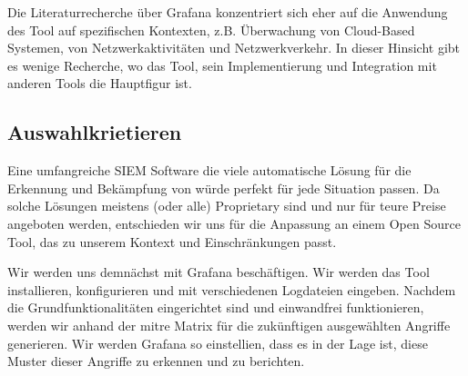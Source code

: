 Die Literaturrecherche über Grafana konzentriert sich eher auf die Anwendung des Tool auf spezifischen Kontexten, z.B. Überwachung von Cloud-Based Systemen, von Netzwerkaktivitäten und Netzwerkverkehr. In dieser Hinsicht gibt es wenige Recherche, wo das Tool, sein Implementierung und Integration mit anderen Tools die Hauptfigur ist.

\subsection{Auswahlkrietieren}
Eine umfangreiche \gls{SIEM} Software die viele automatische Lösung für die Erkennung und Bekämpfung von  würde perfekt für jede Situation passen. Da solche Lösungen meistens (oder alle) \gls{Proprietary} sind und nur für teure Preise angeboten werden, entschieden wir uns für die Anpassung an einem \gls{Open Source} Tool, das zu unserem Kontext und Einschränkungen passt. 

Wir werden uns demnächst mit Grafana beschäftigen. Wir werden das Tool installieren, konfigurieren und mit verschiedenen Logdateien eingeben. Nachdem die Grundfunktionalitäten eingerichtet sind und einwandfrei funktionieren, werden wir anhand der \gls{mitre} Matrix  für die zukünftigen ausgewählten Angriffe generieren. Wir werden Grafana so einstellien, dass es in der Lage ist, diese Muster dieser Angriffe zu erkennen und zu berichten.